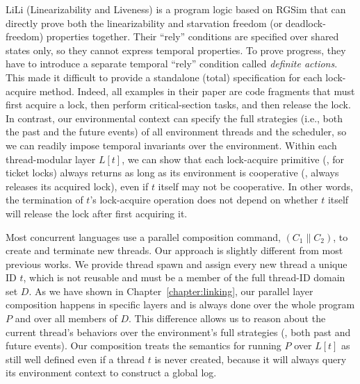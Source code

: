 LiLi (Linearizability and Liveness) is a program logic based on RGSim
that can
directly prove both the linearizability and starvation freedom (or
deadlock-freedom) properties together. 
Their ``rely'' conditions are specified
over shared states only, so they cannot express temporal properties. 
To prove progress, they have to introduce a separate temporal ``rely''
condition called {\em definite actions}.  This made it difficult to
provide a standalone (total) specification for each lock-acquire
method.  Indeed, all examples in their paper are code fragments that
must first acquire a lock, then perform critical-section tasks, and then release the
lock. In contrast, our environmental context can specify the full
strategies (i.e., both the past and the future events) of all
environment threads and the scheduler, so we can readily impose
temporal invariants over the environment. Within each thread-modular
layer $L[t]$, we can show that each lock-acquire primitive (\eg, for
ticket locks) always returns as long as its environment is cooperative
(\eg, always releases its acquired lock), even if $t$ itself may not
be cooperative.
In other words, the termination of $t$'s lock-acquire
operation does not depend on whether $t$ itself will release the lock
after first acquiring it.

Most concurrent languages use a
parallel composition command, $(C_1 \| C_2)$, to create and terminate
new threads.  
Our approach is slightly different from most previous works.
We provide thread spawn and assign every new thread a unique ID $t$,
which is not reusable and must be a member of the full thread-ID domain set $D$.
As we have shown in Chapter~\ref{chapter:linking},
our parallel layer composition happens in specific layers and is
always done over the whole program $P$ and over
all members of $D$. 
This difference allows us to reason about the current
thread's behaviors over the environment's full strategies (\ie, both
past and future events).
Our composition treats the semantics for running $P$ over $L[t]$ as still well
defined even if a thread $t$ is never
created, because it will always query its environment context to
construct a global log.



